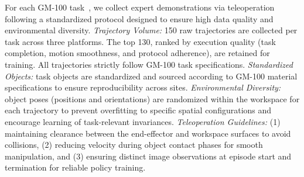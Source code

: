 For each GM-100 task~\cite{gm100}, we collect expert demonstrations via teleoperation following a standardized protocol designed to ensure high data quality and environmental diversity.
\textit{Trajectory Volume:}
150 raw trajectories are collected per task across three platforms. The top 130, ranked by execution quality (task completion, motion smoothness, and protocol adherence), are retained for training. All trajectories strictly follow GM-100 task specifications.
\textit{Standardized Objects:}
task objects are standardized and sourced according to GM-100 material specifications to ensure reproducibility across sites.
\textit{Environmental Diversity:}
object poses (positions and orientations) are randomized within the workspace for each trajectory to prevent overfitting to specific spatial configurations and encourage learning of task-relevant invariances.
\textit{Teleoperation Guidelines:}
(1) maintaining clearance between the end-effector and workspace surfaces to avoid collisions,
(2) reducing velocity during object contact phases for smooth manipulation, and
(3) ensuring distinct image observations at episode start and termination for reliable policy training.
